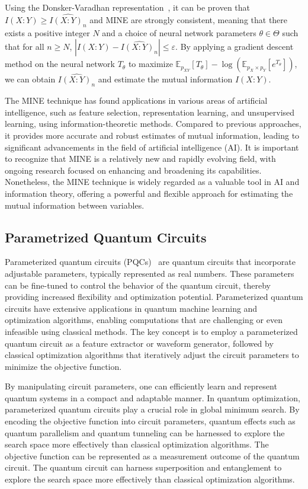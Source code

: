 \documentclass[aps,groupedaddress,superscriptaddress,amssymb,amsmath,amsbsy,amsfonts,twocolumn,pra]{revtex4}
\begin{document}
Using the Donsker-Varadhan representation~\cite{DV76}, it can be proven that $I\left(X:Y\right) \geq \widehat{I\left(X:Y\right)_n}$ and MINE are strongly consistent, meaning that there exists a positive integer $N$ and a choice of neural network parameters $\theta \in \Theta$ such that for all $n \geq N$, $\left|I(X:Y) - \widehat{I(X:Y)_n}\right| \leq \varepsilon$. By applying a gradient descent method on the neural network $T_{\theta}$ to maximize $\mathbb{E}_{p_{XY}}[T_{\theta}]-\log\left(\mathbb{E}_{p_X \times p_Y}\left[e^{T_{\theta}}\right]\right)$, we can obtain $\widehat{I(X:Y)_n}$ and estimate the mutual information $I(X:Y)$.

The MINE technique has found applications in various areas of artificial intelligence, such as feature selection, representation learning, and unsupervised learning, using information-theoretic methods. Compared to previous approaches, it provides more accurate and robust estimates of mutual information, leading to significant advancements in the field of artificial intelligence (AI). It is important to recognize that MINE is a relatively new and rapidly evolving field, with ongoing research focused on enhancing and broadening its capabilities. Nonetheless, the MINE technique is widely regarded as a valuable tool in AI and information theory, offering a powerful and flexible approach for estimating the mutual information between variables.

\subsection{Parametrized Quantum Circuits}
Parameterized quantum circuits (PQCs)~\cite{BLSF19} are quantum circuits that incorporate adjustable parameters, typically represented as real numbers. These parameters can be fine-tuned to control the behavior of the quantum circuit, thereby providing increased flexibility and optimization potential. Parameterized quantum circuits have extensive applications in quantum machine learning and optimization algorithms, enabling computations that are challenging or even infeasible using classical methods. The key concept is to employ a parameterized quantum circuit as a feature extractor or waveform generator, followed by classical optimization algorithms that iteratively adjust the circuit parameters to minimize the objective function.

By manipulating circuit parameters, one can efficiently learn and represent quantum systems in a compact and adaptable manner. In quantum optimization, parameterized quantum circuits play a crucial role in global minimum search. By encoding the objective function into circuit parameters, quantum effects such as quantum parallelism and quantum tunneling can be harnessed to explore the search space more effectively than classical optimization algorithms.
The objective function can be represented as a measurement outcome of the quantum circuit. The quantum circuit can harness superposition and entanglement to explore the search space more effectively than classical optimization algorithms.
\end{document}
